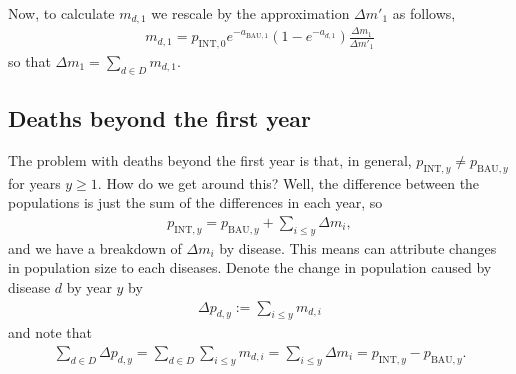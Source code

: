 \documentclass[]{article}
\begin{document}
Now, to calculate $m_{d, 1}$ we rescale by the approximation $\Delta m'_1$ as follows,
\begin{align*}
	m_{d, 1} = p_{\text{INT}, 0} e^{-a_{\text{BAU}, 1}} \left(1 - e^{-a_{d, 1}}\right) \frac{\Delta m_1}{\Delta m'_1} 
\end{align*}
so that $\Delta m_1 = \sum_{d \in D} m_{d, 1}$.

\subsection{Deaths beyond the first year}

The problem with deaths beyond the first year is that, in general, $p_{\text{INT}, y} \neq p_{\text{BAU}, y}$ for years $y \geq 1$. How do we get around this? Well, the difference between the populations is just the sum of the differences in each year, so
\begin{align*}
	p_{\text{INT}, y} = p_{\text{BAU}, y} + \sum_{i \leq y} \Delta m_i,
\end{align*}
and we have a breakdown of $\Delta m_i$ by disease. This means can attribute changes in population size to each diseases. Denote the change in population caused by disease $d$ by year $y$ by
\begin{align*}
	\Delta p_{d, y} := \sum_{i \leq y} m_{d,i}
\end{align*}
and note that 
\begin{align*}
		\sum_{d \in D} \Delta p_{d, y} = \sum_{d \in D}\sum_{i \leq y} m_{d,i} = \sum_{i \leq y} \Delta m_i = p_{\text{INT}, y} - p_{\text{BAU}, y}.
\end{align*}
\end{document}
